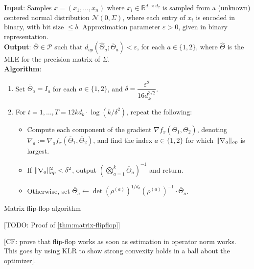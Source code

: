 \documentclass{article}
\DeclarePairedDelimiter{\norm}{\lVert}{\rVert}
\newcommand{\R}{{\mathbb{R}}}
\newcommand{\otheta}{\overline{\Theta}}
\newcommand{\htheta}{\hat{\Theta}}
\newcommand\eps{\varepsilon}
\newcommand\cN{\mathcal{N}}
\newcommand\SPD{\mathcal{P}}
\newcommand\samp{x}
\newcommand{\CF}[1]{{\color{purple}[CF: #1]}}
\newcommand{\TODO}[1]{{\color{blue}[TODO: #1]}}
\begin{document}
\begin{Algorithm}
\textbf{Input}: Samples $\samp = (\samp_1, \ldots, \samp_n)$ where $\samp_i \in \R^{d_1 \times d_2}$ is sampled from a (unknown) centered normal distribution $\cN(0, \Sigma)$, where each entry of $\samp_i$ is encoded in binary, with bit size $\le b$. Approximation parameter $\eps > 0$, given in binary representation. \\[.3ex]

\textbf{Output}: $\otheta \in \SPD$ such that $d_{op}(\htheta_a; \otheta_a) < \eps$, for each $a \in \{1,2\}$, where $\htheta$ is the MLE for the precision matrix of $\Sigma$. \\[.3ex]

\textbf{Algorithm}:
\begin{enumerate}
\item\label{it:flip-flop step 1} Set $\otheta_a = I_a$ for each $a \in \{1,2\}$, and $\delta = \dfrac{\eps^2}{16 d_k^{3/2}}$.
\item\label{it:flip-flop step 2} For $t=1,\dots,T = 12 k d_k \cdot \log(k/\delta^2)$, repeat the following:
\begin{itemize}
\item Compute each component of the gradient $\nabla f_{\samp}(\otheta_1, \otheta_2)$, denoting $\nabla_a := \nabla_a f_{\samp}(\otheta_1, \otheta_2)$, and find the index $a \in \{1,2\}$ for which $\norm{\nabla_a}_{op}$ is largest. 
\item
If $\norm{\nabla_a}_{op}^2 < \delta^2$, output $\left( \bigotimes_{a =1}^k \otheta_a \right)^{-1}$ and return.
\item Otherwise, set $\otheta_a \leftarrow \det(\rho^{(a)})^{1/d_a} (\rho^{(a)})^{-1} \cdot \otheta_a$.
\end{itemize}
\end{enumerate}
\caption{Matrix flip-flop algorithm}\label{alg:flip-flop}
\end{Algorithm}

\TODO{Proof of \cref{thm:matrix-flipflop}}


\CF{prove that flip-flop works as soon as estimation in operator norm works. This goes by using KLR to show strong convexity holds in a ball about the optimizer}.
\end{document}
